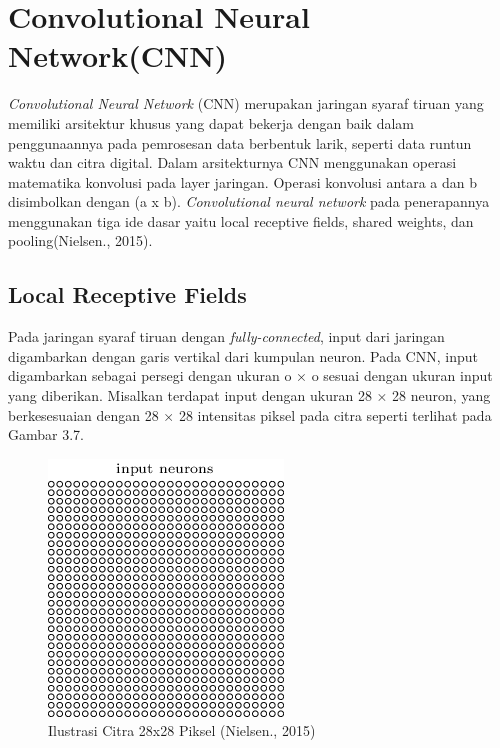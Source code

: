 \section{Convolutional Neural Network(CNN)}
\emph{Convolutional Neural Network} (CNN) merupakan jaringan syaraf tiruan yang memiliki arsitektur khusus yang dapat bekerja dengan baik dalam penggunaannya pada pemrosesan data berbentuk larik, seperti data runtun waktu dan citra digital. Dalam arsitekturnya CNN menggunakan operasi matematika konvolusi pada layer jaringan. Operasi konvolusi antara a dan b disimbolkan dengan (a x b). \emph{Convolutional neural network} pada penerapannya menggunakan tiga ide dasar yaitu local receptive fields, shared weights, dan pooling(Nielsen., 2015).
\subsection{Local Receptive Fields}
Pada jaringan syaraf tiruan dengan \emph{fully-connected}, input dari jaringan 
digambarkan dengan garis vertikal dari kumpulan neuron. Pada CNN, input digambarkan sebagai persegi dengan ukuran o × o sesuai dengan ukuran input yang 
diberikan. Misalkan terdapat input dengan ukuran 28 × 28 neuron, yang 
berkesesuaian dengan 28 × 28 intensitas piksel pada citra seperti terlihat pada 
Gambar 3.7.
\begin{figure}[h]
	\centering
	\includegraphics[width=0.25\linewidth]{neuraon}
	\caption{Ilustrasi Citra 28x28 Piksel (Nielsen., 2015)}
	\label{fig:neuraon}
\end{figure}

